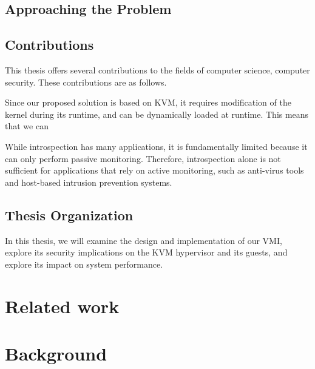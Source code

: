\documentclass{report}
\begin{document}
\begin{spacing}{1.5}
\section{Approaching the Problem}

















\section{Contributions}

This thesis offers several contributions to the fields of computer science, computer
security. These contributions are as follows.

Since our proposed solution is based on KVM, it requires modification of the kernel during its runtime, and can be dynamically loaded at runtime. This means that we can 





While introspection has many applications, it is fundamentally limited because it can only perform passive monitoring. Therefore, introspection alone is not sufficient for applications that rely on active monitoring, such as anti-virus
tools and host-based intrusion prevention systems.











\section{Thesis Organization}

In this thesis, we will examine the design and implementation of our VMI, explore its security implications on the KVM hypervisor and its guests, and explore its impact on system performance.




\chapter{Related work}



\chapter{Background}







\end{spacing}
\end{document}
